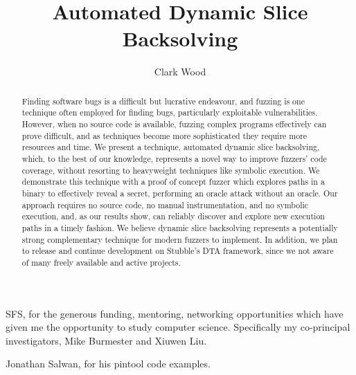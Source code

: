 \documentclass[11pt,expanded,copyright]{fsuthesis}
\title{Automated Dynamic Slice Backsolving}
\author{Clark Wood}
\begin{document}
\frontmatter
\maketitle
\makecommitteepage


\begin{acknowledgments}

SFS, for the generous funding, mentoring, networking opportunities which have given me the opportunity to study computer science. Specifically my co-principal investigators, Mike Burmester and Xiuwen Liu.


Jonathan Salwan, for his pintool code examples.

\end{acknowledgments}

\tableofcontents
\listoffigures




\mainmatter

%

\begin{abstract}

Finding software bugs is a difficult but lucrative endeavour, and fuzzing is one technique often employed for finding bugs, particularly exploitable vulnerabilities. However, when no source code is available, fuzzing complex programs effectively can prove difficult, and as techniques become more sophisticated they require more resources and time. We present a technique, automated dynamic slice backsolving, which, to the best of our knowledge, represents a novel way to improve fuzzers' code coverage, without resorting to heavyweight techniques like symbolic execution. We demonstrate this technique with a proof of concept fuzzer which explores paths in a binary to effectively reveal a secret, performing an oracle attack without an oracle. Our approach requires no source code, no manual instrumentation, and no symbolic execution, and, as our results show, can reliably discover and explore new execution paths in a timely fashion. We believe dynamic slice backsolving represents a potentially strong complementary technique for modern fuzzers to implement. In addition, we plan to release and continue development on Stubble's DTA framework, since we not aware of many freely available and active projects.

\end{abstract}
\end{document}
